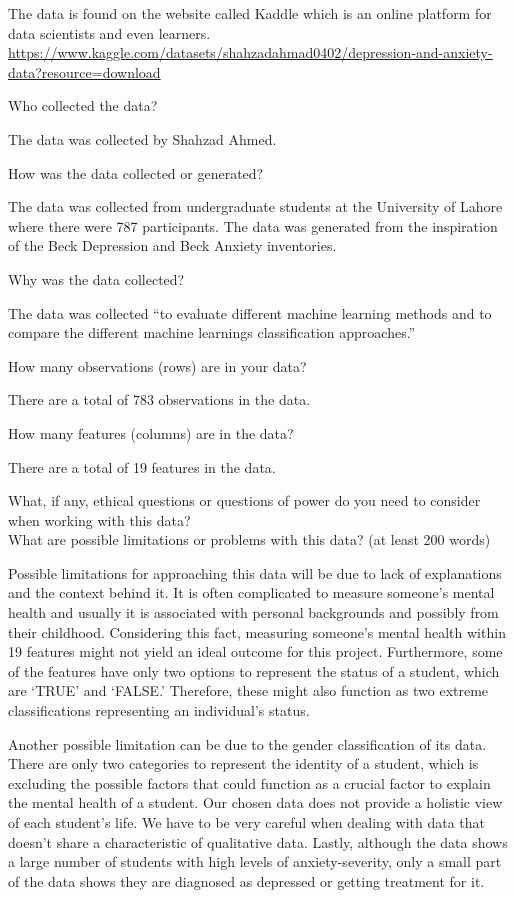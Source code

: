 \documentclass[
]{article}
\begin{document}
The data is found on the website called Kaddle which is an online
platform for data scientists and even learners.
\url{https://www.kaggle.com/datasets/shahzadahmad0402/depression-and-anxiety-data?resource=download}

Who collected the data?

The data was collected by Shahzad Ahmed.

How was the data collected or generated?

The data was collected from undergraduate students at the University of
Lahore where there were 787 participants. The data was generated from
the inspiration of the Beck Depression and Beck Anxiety inventories.

Why was the data collected?

The data was collected ``to evaluate different machine learning methods
and to compare the different machine learnings classification
approaches.''

How many observations (rows) are in your data?

There are a total of 783 observations in the data.

How many features (columns) are in the data?

There are a total of 19 features in the data.

What, if any, ethical questions or questions of power do you need to
consider when working with this data?\\
What are possible limitations or problems with this data? (at least 200
words)

Possible limitations for approaching this data will be due to lack of
explanations and the context behind it. It is often complicated to
measure someone's mental health and usually it is associated with
personal backgrounds and possibly from their childhood. Considering this
fact, measuring someone's mental health within 19 features might not
yield an ideal outcome for this project. Furthermore, some of the
features have only two options to represent the status of a student,
which are `TRUE' and `FALSE.' Therefore, these might also function as
two extreme classifications representing an individual's status.

Another possible limitation can be due to the gender classification of
its data. There are only two categories to represent the identity of a
student, which is excluding the possible factors that could function as
a crucial factor to explain the mental health of a student. Our chosen
data does not provide a holistic view of each student's life. We have to
be very careful when dealing with data that doesn't share a
characteristic of qualitative data. Lastly, although the data shows a
large number of students with high levels of anxiety-severity, only a
small part of the data shows they are diagnosed as depressed or getting
treatment for it.
\end{document}
